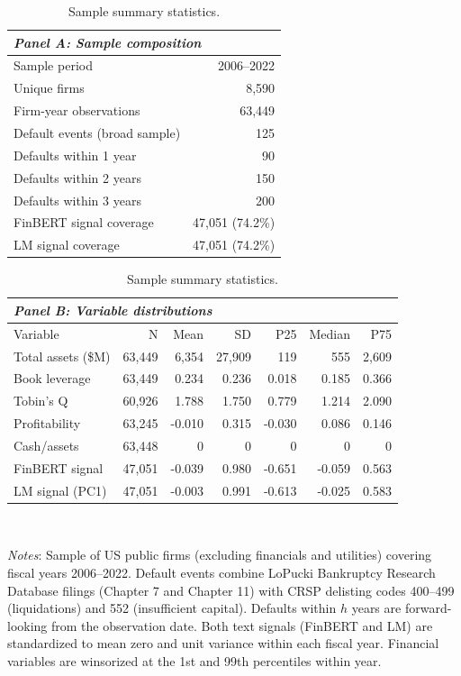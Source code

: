 \begin{table}[htbp]
\centering
\caption{Sample summary statistics.}
\label{tab:t1_sample_summary}
\small
\begin{tabular}{lr}
\multicolumn{2}{l}{\textit{Panel A: Sample composition}} \\
\toprule
Sample period & 2006--2022 \\
Unique firms & 8,590 \\
Firm-year observations & 63,449 \\
\midrule
Default events (broad sample) & 125 \\
\quad Defaults within 1 year & 90 \\
\quad Defaults within 2 years & 150 \\
\quad Defaults within 3 years & 200 \\
\midrule
FinBERT signal coverage & 47,051 (74.2\%) \\
LM signal coverage & 47,051 (74.2\%) \\
\bottomrule
\end{tabular}
\vspace{1em}
\begin{tabular}{lrrrrrr}
\multicolumn{7}{l}{\textit{Panel B: Variable distributions}} \\
\toprule
Variable & N & Mean & SD & P25 & Median & P75 \\
\midrule
Total assets (\$M) & 63,449 & 6,354 & 27,909 & 119 & 555 & 2,609 \\
Book leverage & 63,449 & 0.234 & 0.236 & 0.018 & 0.185 & 0.366 \\
Tobin's Q & 60,926 & 1.788 & 1.750 & 0.779 & 1.214 & 2.090 \\
Profitability & 63,245 & -0.010 & 0.315 & -0.030 & 0.086 & 0.146 \\
Cash/assets & 63,448 & 0 & 0 & 0 & 0 & 0 \\
FinBERT signal & 47,051 & -0.039 & 0.980 & -0.651 & -0.059 & 0.563 \\
LM signal (PC1) & 47,051 & -0.003 & 0.991 & -0.613 & -0.025 & 0.583 \\
\bottomrule
\end{tabular}
\\[-1ex]
\begin{flushleft}
\footnotesize
\textit{Notes}: Sample of US public firms (excluding financials and utilities) covering fiscal years 2006--2022. Default events combine LoPucki Bankruptcy Research Database filings (Chapter 7 and Chapter 11) with CRSP delisting codes 400--499 (liquidations) and 552 (insufficient capital). Defaults within $h$ years are forward-looking from the observation date. Both text signals (FinBERT and LM) are standardized to mean zero and unit variance within each fiscal year. Financial variables are winsorized at the 1st and 99th percentiles within year.
\end{flushleft}
\end{table}